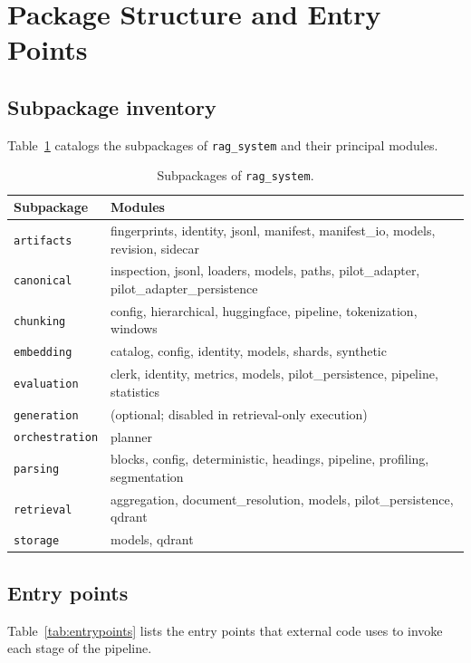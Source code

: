 \documentclass[11pt,a4paper]{article}
\begin{document}
\section{Package Structure and Entry Points}\label{sec:packages}

\subsection{Subpackage inventory}
Table~\ref{tab:packages} catalogs the subpackages of
\texttt{rag\_system} and their principal modules.

\begin{table}[h]
\centering
\caption{Subpackages of \texttt{rag\_system}.}
\label{tab:packages}
\small
\begin{tabular}{l l}
\toprule
\textbf{Subpackage} & \textbf{Modules} \\
\midrule
\texttt{artifacts} & fingerprints, identity, jsonl, manifest, manifest\_io, models, revision, sidecar \\
\texttt{canonical} & inspection, jsonl, loaders, models, paths, pilot\_adapter, pilot\_adapter\_persistence \\
\texttt{chunking} & config, hierarchical, huggingface, pipeline, tokenization, windows \\
\texttt{embedding} & catalog, config, identity, models, shards, synthetic \\
\texttt{evaluation} & clerk, identity, metrics, models, pilot\_persistence, pipeline, statistics \\
\texttt{generation} & (optional; disabled in retrieval-only execution) \\
\texttt{orchestration} & planner \\
\texttt{parsing} & blocks, config, deterministic, headings, pipeline, profiling, segmentation \\
\texttt{retrieval} & aggregation, document\_resolution, models, pilot\_persistence, qdrant \\
\texttt{storage} & models, qdrant \\
\bottomrule
\end{tabular}
\end{table}

\subsection{Entry points}
Table~\ref{tab:entrypoints} lists the entry points that external
code uses to invoke each stage of the pipeline.
\end{document}
